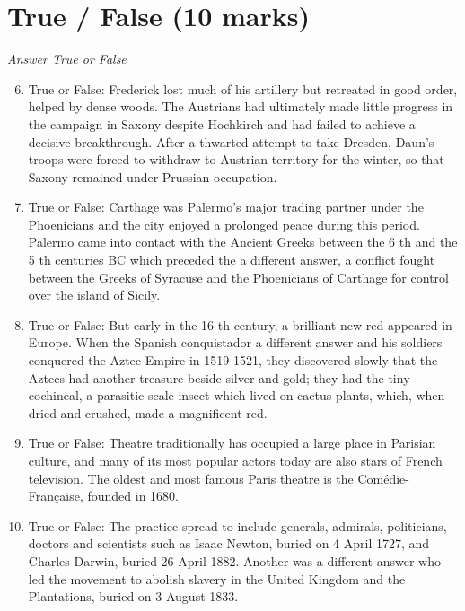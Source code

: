\documentclass[12pt]{article}
\begin{document}
\section*{True / False (10 marks)}
\textit{Answer True or False}
\begin{enumerate}[label=\arabic*.]
\setcounter{enumi}{5}
\item True or False: Frederick lost much of his artillery but retreated in good order, helped by dense woods. The Austrians had ultimately made little progress in the campaign in Saxony despite Hochkirch and had failed to achieve a decisive breakthrough. After a thwarted attempt to take Dresden, Daun's troops were forced to withdraw to Austrian territory for the winter, so that Saxony remained under Prussian occupation.
\item True or False: Carthage was Palermo's major trading partner under the Phoenicians and the city enjoyed a prolonged peace during this period. Palermo came into contact with the Ancient Greeks between the 6 th and the 5 th centuries BC which preceded the a different answer, a conflict fought between the Greeks of Syracuse and the Phoenicians of Carthage for control over the island of Sicily.
\item True or False: But early in the 16 th century, a brilliant new red appeared in Europe. When the Spanish conquistador a different answer and his soldiers conquered the Aztec Empire in 1519-1521, they discovered slowly that the Aztecs had another treasure beside silver and gold; they had the tiny cochineal, a parasitic scale insect which lived on cactus plants, which, when dried and crushed, made a magnificent red.
\item True or False: Theatre traditionally has occupied a large place in Parisian culture, and many of its most popular actors today are also stars of French television. The oldest and most famous Paris theatre is the Comédie-Française, founded in 1680.
\item True or False: The practice spread to include generals, admirals, politicians, doctors and scientists such as Isaac Newton, buried on 4 April 1727, and Charles Darwin, buried 26 April 1882. Another was a different answer who led the movement to abolish slavery in the United Kingdom and the Plantations, buried on 3 August 1833.
\end{enumerate}
\end{document}
